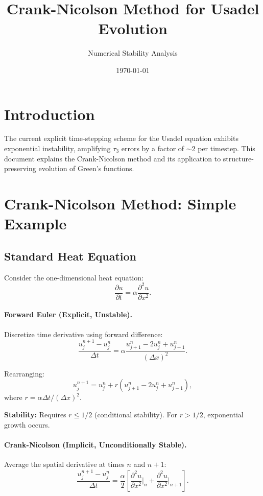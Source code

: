\documentclass[11pt]{article}
\title{Crank-Nicolson Method for Usadel Evolution}
\author{Numerical Stability Analysis}
\date{\today}
\begin{document}
\maketitle

\section{Introduction}

The current explicit time-stepping scheme for the Usadel equation exhibits exponential instability, amplifying $\tau_3$ errors by a factor of $\sim 2$ per timestep. This document explains the Crank-Nicolson method and its application to structure-preserving evolution of Green's functions.

\section{Crank-Nicolson Method: Simple Example}

\subsection{Standard Heat Equation}

Consider the one-dimensional heat equation:
\begin{equation}
\frac{\partial u}{\partial t} = \alpha \frac{\partial^2 u}{\partial x^2}.
\end{equation}

\paragraph{Forward Euler (Explicit, Unstable).}
Discretize time derivative using forward difference:
\begin{equation}
\frac{u_j^{n+1} - u_j^n}{\Delta t} = \alpha \frac{u_{j+1}^n - 2u_j^n + u_{j-1}^n}{(\Delta x)^2}.
\end{equation}

Rearranging:
\begin{equation}
u_j^{n+1} = u_j^n + r(u_{j+1}^n - 2u_j^n + u_{j-1}^n),
\end{equation}
where $r = \alpha \Delta t / (\Delta x)^2$.

\textbf{Stability:} Requires $r \leq 1/2$ (conditional stability). For $r > 1/2$, exponential growth occurs.

\paragraph{Crank-Nicolson (Implicit, Unconditionally Stable).}
Average the spatial derivative at times $n$ and $n+1$:
\begin{equation}
\frac{u_j^{n+1} - u_j^n}{\Delta t} = \frac{\alpha}{2} \left[ \frac{\partial^2 u}{\partial x^2}\bigg|_n + \frac{\partial^2 u}{\partial x^2}\bigg|_{n+1} \right].
\end{equation}
\end{document}
